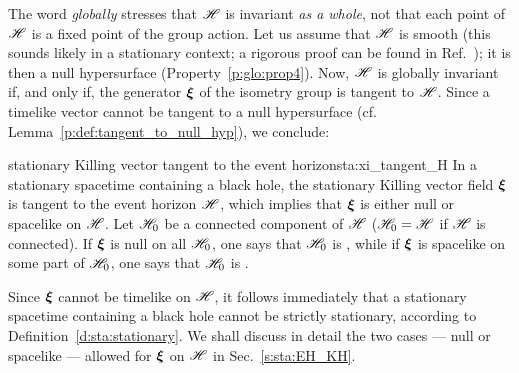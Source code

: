The word \emph{globally} stresses that
$\mathscr{H}$ is invariant \emph{as a whole}, not that
each point of $\mathscr{H}$ is a fixed point of the group action.
Let us assume that $\mathscr{H}$ is smooth (this sounds likely in a stationary context;
a rigorous proof can be found in Ref.~\cite{ChrusDGH01});
it is then a null hypersurface (Property~\ref{p:glo:prop4}).
Now, $\mathscr{H}$ is globally invariant if, and only if, the
generator $\bm{\xi}$ of the isometry group is tangent to $\mathscr{H}$.
Since a timelike vector cannot be tangent to a null hypersurface (cf.
Lemma~\ref{p:def:tangent_to_null_hyp}), we conclude:

\begin{tprop}{stationary Killing vector tangent to the event horizon}{sta:xi_tangent_H}
In a stationary spacetime containing a black hole,
the stationary Killing vector field  $\bm{\xi}$ is tangent to the event horizon
$\mathscr{H}$, which implies that $\bm{\xi}$ is either null or spacelike on $\mathscr{H}$.
Let $\mathscr{H}_0$ be a connected component of $\mathscr{H}$
($\mathscr{H}_0 = \mathscr{H}$ if $\mathscr{H}$ is connected).
If $\bm{\xi}$ is null on all $\mathscr{H}_0$, one says that $\mathscr{H}_0$
is , while if $\bm{\xi}$ is
spacelike on some part of $\mathscr{H}_0$, one says that $\mathscr{H}_0$ is
.
\end{tprop}

Since $\bm{\xi}$ cannot be timelike on $\mathscr{H}$, it follows immediately
that a stationary spacetime containing a black hole cannot be strictly stationary,
according to Definition~\ref{d:sta:stationary}.
We shall discuss in detail the two cases --- null or spacelike --- allowed
for $\bm{\xi}$ on $\mathscr{H}$ in Sec.~\ref{s:sta:EH_KH}.


